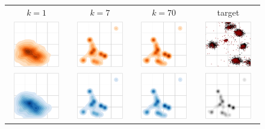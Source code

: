 \begin{figure}
\begin{centering}
\begin{tabular}{ccc|c}
$k=1$ & $k=7$ & $k=70$ & target\tabularnewline
\includegraphics[width=3cm,height=2cm]{figures/toy_save/output_dist_k=1-crop.pdf} & \includegraphics[width=3cm,height=2cm]{figures/toy_save/output_dist_k=20-crop.pdf} & \includegraphics[width=3cm,height=2cm]{figures/toy_save/output_dist_k=70-crop.pdf} &  \includegraphics[width=3cm,height=2cm]{figures/scatter_output_particles_k=70-crop.pdf}\tabularnewline
\includegraphics[width=3cm,height=2cm]{figures/toy_load/output_dist_k=1-crop.pdf} & \includegraphics[width=3cm,height=2cm]{figures/toy_load/output_dist_k=20-crop.pdf} & \includegraphics[width=3cm,height=2cm]{figures/toy_load/output_dist_k=70-crop.pdf} &  \includegraphics[width=3cm,height=2cm]{figures/target-crop.pdf}\tabularnewline

\end{tabular}
\end{centering}
\end{figure}
